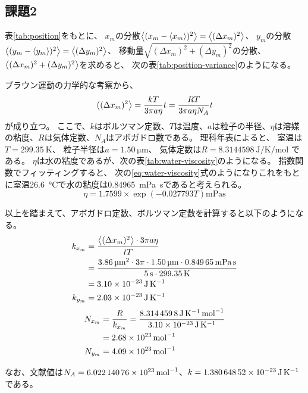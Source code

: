 \subsection{課題2}

表\ref{tab:position}をもとに、
$x_m$の分散$\left< (x_m-\left< x_m \right>)^2 \right>=\left< (\Delta x_m)^2 \right>$、
$y_m$の分散$\left< (y_m-\left< y_m \right>)^2 \right>=\left< (\Delta y_m)^2 \right>$、
移動量$\sqrt{(\Delta x_m)^2 + (\Delta y_m)^2}$の分散、$\left< (\Delta x_m)^2 + (\Delta y_m)^2 \right>$を求めると、
次の表\ref{tab:position-variance}のようになる。



ブラウン運動の力学的な考察から、
\begin{equation}\label{eq:brownian-motion}
    \left< (\Delta x_m)^2 \right> = \dfrac{kT}{3\pi a \eta} t = \dfrac{RT}{3 \pi a \eta N_A} t
\end{equation}
が成り立つ。
ここで、$k$はボルツマン定数、$T$は温度、$a$は粒子の半径、$\eta$は溶媒の粘度、$R$は気体定数、$N_A$はアボガドロ数である。
理科年表\cite{rika-nenpyo}によると、
室温は$T=\SI{299.35}{\kelvin}$、
粒子半径は$a=\SI{1.50}{\micro\meter}$、
気体定数は$R=\SI{8.3144598}{\joule\per\kelvin\per\mole}$
である。
$\eta$は水の粘度であるが、次の表\ref{tab:water-viscosity}のようになる。
指数関数でフィッティングすると、
次の\ref{eq:water-viscosity}式のようになりこれをもとに室温\SI{26.6}{\celsius}で水の粘度は\SI{0.84965}{\milli\pascal\second}であると考えられる。
\begin{equation}\label{eq:water-viscosity}
    \eta = 1.7599 \times \exp(-0.027793T) \si{\milli\pascal\second}
\end{equation}



以上を踏まえて、アボガドロ定数、ボルツマン定数を計算すると以下のようになる。
\begin{align}
    k_{x_m} & = \dfrac{\left< (\Delta x_m)^2 \right> \cdot 3 \pi a \eta}{tT}                                                                                                            \nonumber          \\
            & = \dfrac{\SI{3.86}{\micro\meter\squared} \cdot 3 \pi \cdot \SI{1.50}{\micro\meter} \cdot \SI{0.84965}{\milli\pascal\second}}{\SI{5}{\second} \cdot \SI{299.35}{\kelvin}} \nonumber \\
            & = \SI{3.10E-23}{\joule\per\kelvin}                                                                                                                                                 \\
    k_{y_m} & = \SI{2.03E-23}{\joule\per\kelvin}
\end{align}
\begin{align}
    N_{x_m} & = \dfrac{R}{k_{x_m}} = \dfrac{\SI{8.3144598}{\joule\per\kelvin\per\mole}}{\SI{3.10E-23}{\joule\per\kelvin}} \nonumber \\
            & = \SI{2.68E23}{\per\mole}                                                                                             \\
    N_{y_m} & = \SI{4.09E23}{\per\mole}
\end{align}

なお、文献値は$N_A=\SI{6.02214076E23}{\per\mole}$、$k=\SI{1.38064852E-23}{\joule\per\kelvin}$である。
